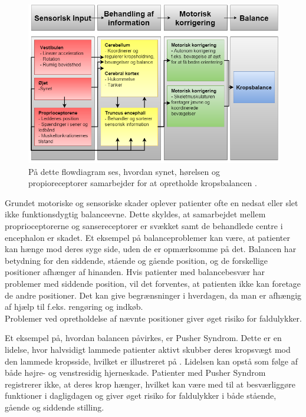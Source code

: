 \begin{figure}[H]
	\centering
	\includegraphics[scale=0.55]{figures/bProblemanalyse/Balance-Flowdiagram.png}
	\caption{På dette flowdiagram ses, hvordan synet, hørelsen og propioreceptorer samarbejder for at opretholde kropsbalancen \cite{watson2015}.}
	\label{flowbalance1}
\end{figure}

Grundet motoriske og sensoriske skader oplever patienter ofte en nedsat eller slet ikke funktionsdygtig balanceevne. \cite{Karnath2003} Dette skyldes, at samarbejdet mellem proprioceptorerne og sansereceptorer er svækket samt de behandlede centre i encephalon er skadet. \cite{Martini2012}
Et eksempel på balanceproblemer kan være, at patienter kan hænge mod deres syge side, uden de er opmærksomme på det. Balancen har betydning for den siddende, stående og gående position, og de forskellige positioner afhænger af hinanden. Hvis patienter med balancebesvær har problemer med siddende position, vil det forventes, at patienten ikke kan foretage de andre positioner. Det kan give begrænsninger i hverdagen, da man er afhængig af hjælp til f.eks. rengøring og indkøb. \cite{Karnath2003} \\
Problemer ved opretholdelse af nævnte positioner giver øget risiko for faldulykker. \cite{Karnath2003} 

Et eksempel på, hvordan balancen påvirkes, er Pusher Syndrom. Dette er en lidelse, hvor halvsidigt lammede patienter aktivt skubber deres kropsvægt mod den lammede kropsside, hvilket er illustreret på . Lidelsen kan opstå som følge af både højre- og venstresidig hjerneskade. Patienter med Pusher Syndrom registrerer ikke, at deres krop hænger, hvilket kan være med til at besværliggøre funktioner i dagligdagen og giver øget risiko for faldulykker i både stående, gående og siddende stilling. \cite{Karnath2003} 

